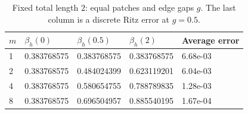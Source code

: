 \begin{table}[htbp]
\centering
\caption{Fixed total length $2$: equal patches and edge gaps $g$. The last column is a discrete Ritz error at $g=0.5$.}
\label{tab:connectivity}
\begin{tabular}{lllll}
\toprule
$m$ & $\beta_h(0)$ & $\beta_h(0.5)$ & $\beta_h(2)$ & Average error \\
\midrule
1 & 0.383768575 & 0.383768575 & 0.383768575 & 6.68e-03 \\
2 & 0.383768575 & 0.484024399 & 0.623119201 & 6.04e-03 \\
4 & 0.383768575 & 0.580654755 & 0.788789835 & 1.28e-03 \\
8 & 0.383768575 & 0.696504957 & 0.885540195 & 1.67e-04 \\
\bottomrule
\end{tabular}
\end{table}
